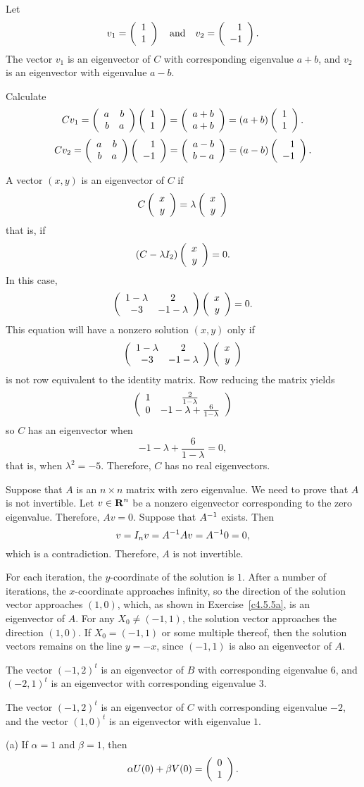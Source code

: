 \ans Let
\[ v_1 = \left(\begin{array}{r} 1 \\ 1\end{array}\right) \quad\mbox{and}\quad v_2 = \left(\begin{array}{r} 1 \\ -1\end{array}\right). \]
The vector $v_1$ is an eigenvector of $C$ with corresponding
eigenvalue $a + b$, and $v_2$ is an eigenvector with eigenvalue $a - b$.

\soln Calculate
\[ Cv_1 = \left(\begin{array}{rr} a & b\\ b &a\end{array}\right)\left(\begin{array}{r} 1 \\ 1\end{array}\right) = \left(\begin{array}{r} a + b \\ a + b\end{array}\right) =
(a + b)\left(\begin{array}{r} 1 \\ 1\end{array}\right). \]
\[ Cv_2 = \left(\begin{array}{rr} a & b\\ b &a\end{array}\right)\left(\begin{array}{r} 1 \\ -1\end{array}\right) = \left(\begin{array}{r} a - b \\ b - a\end{array}\right) =
(a - b)\left(\begin{array}{r} 1 \\ -1\end{array}\right). \]


A vector $(x,y)$ is an eigenvector of $C$ if
\[ C\left(\begin{array}{r} x \\ y\end{array}\right) = \lambda\left(\begin{array}{r} x \\ y\end{array}\right) \]
that is, if
\[ (C - \lambda I_2)\left(\begin{array}{r} x \\ y\end{array}\right) = 0. \]
In this case,
\[ \left(\begin{array}{cc} 1 - \lambda & 2\\ -3 &-1 - \lambda\end{array}\right)
\left(\begin{array}{r} x \\ y\end{array}\right) = 0. \]
This equation will have a nonzero solution $(x,y)$ only if
\[ \left(\begin{array}{cc} 1 - \lambda & 2\\ -3 &-1 - \lambda\end{array}\right)\left(\begin{array}{r} x \\ y\end{array}\right) \]
is not row equivalent to the identity matrix.
Row reducing the matrix yields
\[ \left(\begin{array}{cc} 1 & \frac{2}{1 - \lambda}\\ 0 &-1 - \lambda + \frac{6}{1-\lambda}\end{array}\right) \]
so $C$ has an eigenvector when
\[ -1 - \lambda + \frac{6}{1-\lambda} = 0, \]
that is, when $\lambda^2 = -5$.  Therefore, $C$ has no real 
eigenvectors.

Suppose that $A$ is an $n\times n$ matrix with zero eigenvalue.  We need to
prove that $A$ is not invertible.  Let $v\in\mbox{$\bf{R}$}^n$ be a nonzero 
eigenvector corresponding to the zero eigenvalue.  Therefore, $Av=0$. 
Suppose that $A^{-1}$ exists.  Then
\[
v = I_nv = A^{-1} Av = A^{-1} 0 = 0,
\]
which is a contradiction.  Therefore, $A$ is not invertible.

For each iteration, the $y$-coordinate of the solution is $1$.  After a
number of iterations, the $x$-coordinate approaches infinity, so the
direction of the solution vector approaches $(1,0)$, which, as shown
in Exercise~\ref{c4.5.5a}, is an eigenvector of $A$.  For any $X_0
\neq (-1,1)$, the solution vector approaches the direction
$(1,0)$.  If $X_0 = (-1,1)$ or some multiple thereof, then the solution
vectors remains on the line $y = -x$, since $(-1,1)$ is also an
eigenvector of $A$.

 The vector $(-1,2)^t$ is an eigenvector of $B$ with
corresponding eigenvalue $6$, and $(-2,1)^t$ is an eigenvector with
corresponding eigenvalue $3$.

\newpage
{} The vector $(-1,2)^t$ is an eigenvector of $C$ with
corresponding eigenvalue $-2$, and the vector $(1,0)^t$ is an eigenvector
with eigenvalue $1$.


(a) \ans If $\alpha = 1$ and $\beta = 1$, then
\[
\alpha U(0) + \beta V(0) = \left(\begin{array}{r} 0 \\ 1\end{array}\right). 
\]

